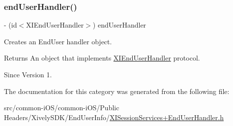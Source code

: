 \subsubsection{\texorpdfstring{end\+User\+Handler()}{endUserHandler()}}
{\footnotesize\ttfamily -\/ (id$<$X\+I\+End\+User\+Handler$>$) end\+User\+Handler \begin{DoxyParamCaption}{ }\end{DoxyParamCaption}}



Creates an End\+User handler object. 

\begin{DoxyReturn}{Returns}
An object that implements \hyperlink{}{X\+I\+End\+User\+Handler} protocol. 
\end{DoxyReturn}
\begin{DoxySince}{Since}
Version 1. 
\end{DoxySince}


The documentation for this category was generated from the following file\+:\begin{DoxyCompactItemize}
\item 
src/common-\/i\+O\+S/common-\/i\+O\+S/\+Public Headers/\+Xively\+S\+D\+K/\+End\+User\+Info/\hyperlink{_x_i_session_services_09_end_user_handler_8h}{X\+I\+Session\+Services+\+End\+User\+Handler.\+h}\end{DoxyCompactItemize}

